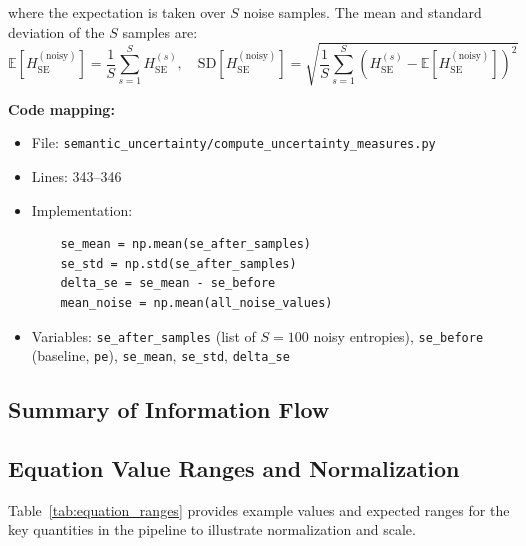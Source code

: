 \documentclass{article}
\begin{document}
where the expectation is taken over $S$ noise samples. The mean and standard deviation of the $S$ samples are:
\begin{equation}
\mathbb{E}[H_{\text{SE}}^{(\text{noisy})}] = \frac{1}{S} \sum_{s=1}^{S} H_{\text{SE}}^{(s)}, \quad \text{SD}[H_{\text{SE}}^{(\text{noisy})}] = \sqrt{\frac{1}{S} \sum_{s=1}^{S} \left(H_{\text{SE}}^{(s)} - \mathbb{E}[H_{\text{SE}}^{(\text{noisy})}]\right)^2}
\label{eq:se_statistics}
\end{equation}

\textbf{Code mapping:}
\begin{itemize}
    \item File: \texttt{semantic\_uncertainty/compute\_uncertainty\_measures.py}
    \item Lines: 343--346
    \item Implementation:
    \begin{verbatim}
    se_mean = np.mean(se_after_samples)
    se_std = np.std(se_after_samples)
    delta_se = se_mean - se_before
    mean_noise = np.mean(all_noise_values)
    \end{verbatim}
    \item Variables: \texttt{se\_after\_samples} (list of $S=100$ noisy entropies), \texttt{se\_before} (baseline, \texttt{pe}), \texttt{se\_mean}, \texttt{se\_std}, \texttt{delta\_se}
\end{itemize}

\subsection{Summary of Information Flow}

\subsection{Equation Value Ranges and Normalization}

Table~\ref{tab:equation_ranges} provides example values and expected ranges for the key quantities in the pipeline to illustrate normalization and scale.
\end{document}
